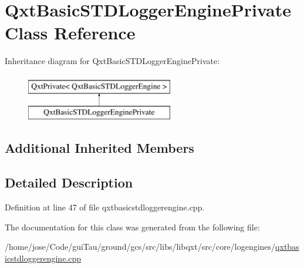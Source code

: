 \hypertarget{class_qxt_basic_s_t_d_logger_engine_private}{\section{Qxt\-Basic\-S\-T\-D\-Logger\-Engine\-Private Class Reference}
\label{class_qxt_basic_s_t_d_logger_engine_private}
}
Inheritance diagram for Qxt\-Basic\-S\-T\-D\-Logger\-Engine\-Private\-:\begin{figure}[H]
\begin{center}
\leavevmode
\includegraphics[height=2.000000cm]{class_qxt_basic_s_t_d_logger_engine_private}
\end{center}
\end{figure}
\subsection*{Additional Inherited Members}


\subsection{Detailed Description}


Definition at line 47 of file qxtbasicstdloggerengine.\-cpp.



The documentation for this class was generated from the following file\-:\begin{DoxyCompactItemize}
\item 
/home/jose/\-Code/gui\-Tau/ground/gcs/src/libs/libqxt/src/core/logengines/\hyperlink{qxtbasicstdloggerengine_8cpp}{qxtbasicstdloggerengine.\-cpp}\end{DoxyCompactItemize}
